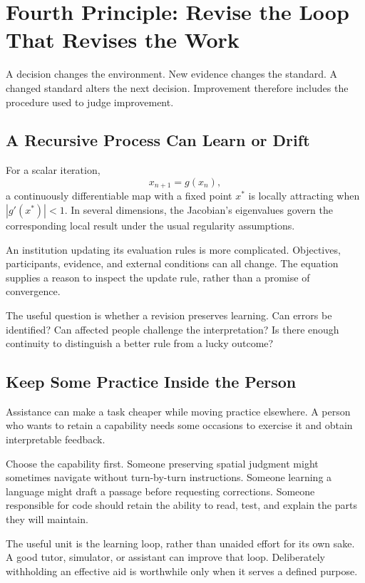 \section{Fourth Principle: Revise the Loop That Revises the Work}

A decision changes the environment. New evidence changes the standard. A changed standard alters the next decision. Improvement therefore includes the procedure used to judge improvement.

\subsection{A Recursive Process Can Learn or Drift}

For a scalar iteration,
\begin{equation}
 x_{n+1}=g(x_n),
\end{equation}
a continuously differentiable map with a fixed point $x^\ast$ is locally attracting when $|g'(x^\ast)|<1$. In several dimensions, the Jacobian's eigenvalues govern the corresponding local result under the usual regularity assumptions.

An institution updating its evaluation rules is more complicated. Objectives, participants, evidence, and external conditions can all change. The equation supplies a reason to inspect the update rule, rather than a promise of convergence.

The useful question is whether a revision preserves learning. Can errors be identified? Can affected people challenge the interpretation? Is there enough continuity to distinguish a better rule from a lucky outcome?

\subsection{Keep Some Practice Inside the Person}

Assistance can make a task cheaper while moving practice elsewhere. A person who wants to retain a capability needs some occasions to exercise it and obtain interpretable feedback.

Choose the capability first. Someone preserving spatial judgment might sometimes navigate without turn-by-turn instructions. Someone learning a language might draft a passage before requesting corrections. Someone responsible for code should retain the ability to read, test, and explain the parts they will maintain.

The useful unit is the learning loop, rather than unaided effort for its own sake. A good tutor, simulator, or assistant can improve that loop. Deliberately withholding an effective aid is worthwhile only when it serves a defined purpose.

